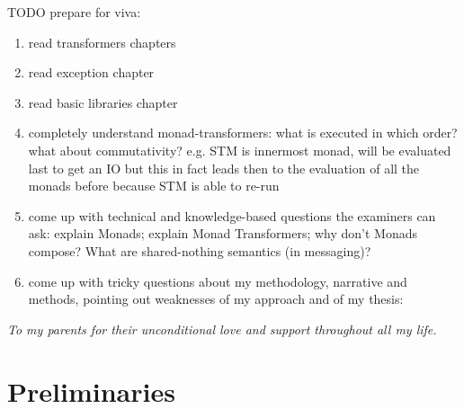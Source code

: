 \documentclass[oneside]{book}
\begin{document}
TODO prepare for viva:
\begin{enumerate}
	\item read transformers chapters
	
	\item read exception chapter

	\item read basic libraries chapter	
	
	\item completely understand monad-transformers: what is executed in which order? what about commutativity? e.g. STM is innermost monad, will be evaluated last to get an IO but this in fact leads then to the evaluation of all the monads before because STM is able to re-run
	
	\item come up with technical and knowledge-based questions the examiners can ask: explain Monads; explain Monad Transformers; why don't Monads compose? What are shared-nothing semantics (in messaging)? 
	
	\item come up with tricky questions about my methodology, narrative and methods, pointing out weaknesses of my approach and of my thesis:
\end{enumerate}


\clearpage
\tableofcontents
\clearpage
\textit{To my parents for their unconditional love and support throughout all my life.}
\clearpage



\epigraphhead[450]{}
\part{Preliminaries}


\end{document}
